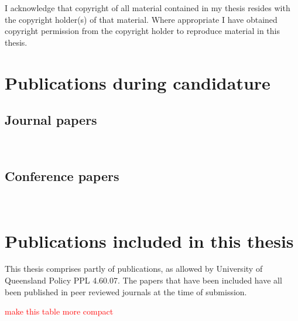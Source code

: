   I acknowledge that copyright of all material contained in my thesis resides with the copyright holder(s) of that material. Where appropriate I have obtained copyright permission from the copyright holder to reproduce material in this thesis.

\clearpage
\section*{Publications during candidature}

\subsection*{Journal papers}

\noindent{}\\


\subsection*{Conference papers}

\noindent{}\\


\section*{Publications included in this thesis}

This thesis comprises partly of publications, as allowed by University of Queensland Policy PPL 4.60.07. The papers that have been included have all been published in peer reviewed journals at the time of submission. 


\textcolor{red}{make this table more compact}


\vspace{\baselineskip}

